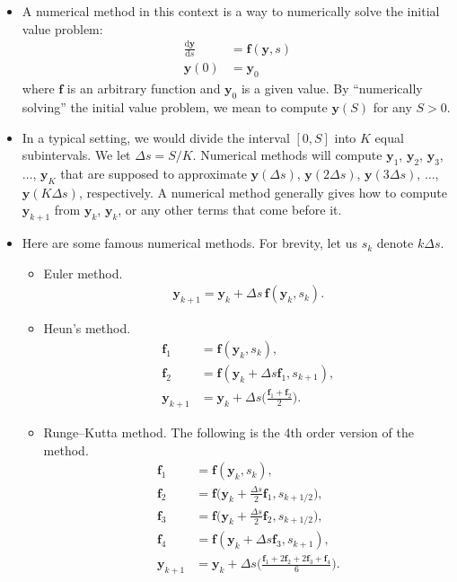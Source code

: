 \documentclass[10pt]{article}
\newcommand{\dee}{\mathrm{d}}
\newcommand{\ve}[1]{\mathbf{#1}}
\begin{document}
\begin{itemize}
  \item A numerical method in this context is a way to numerically solve the initial value problem:
  \begin{align*}
    \frac{\dee \ve{y}}{\dee s} &= \ve{f}(\ve{y}, s) \\
    \ve{y}(0) &= \ve{y}_0
  \end{align*}  
  where $\ve{f}$ is an arbitrary function and $\ve{y}_0$ is a given value. By ``numerically solving'' the initial value problem, we mean to compute $\ve{y}(S)$ for any $S > 0$.

  \item In a typical setting, we would divide the interval $[0,S]$ into $K$ equal subintervals. We let $\Delta s = S/K$. Numerical methods will compute $\ve{y}_{1}$, $\ve{y}_{2}$, $\ve{y}_{3}$, $\dotsc$, $\ve{y}_{K}$ that are supposed to approximate $\ve{y}(\Delta s)$, $\ve{y}(2\Delta s)$, $\ve{y}(3\Delta s)$, $\dotsc$, $\ve{y}(K \Delta s)$, respectively. A numerical method generally gives how to compute $\ve{y}_{k+1}$ from $\ve{y}_{k}$, $\ve{y}_{k}$, or any other terms that come before it.
  
  \item Here are some famous numerical methods. For brevity, let us $s_k$ denote $k \Delta s$.
  \begin{itemize}
    \item Euler method.
    \begin{align*}
      \ve{y}_{k+1} = \ve{y}_k + \Delta s\, \ve{f}(\ve{y}_k, s_k).
    \end{align*}

    \item Heun's method.
    \begin{align*}
      \ve{f}_1 &= \ve{f}(\ve{y}_k, s_k), \\
      \ve{f}_2 &= \ve{f}(\ve{y}_k + \Delta s\ve{f}_1, s_{k+1}), \\
      \ve{y}_{k+1} &= \ve{y}_k + \Delta s \bigg( \frac{\ve{f}_1 + \ve{f}_2}{2} \bigg).
    \end{align*}    

    \item Runge--Kutta method. The following is the 4th order version of the method.
    \begin{align*}
      \ve{f}_1 &= \ve{f}(\ve{y}_k, s_k), \\
      \ve{f}_2 &= \ve{f}\bigg(\ve{y}_k + \frac{\Delta s}{2}\ve{f}_1, s_{k+1/2} \bigg), \\
      \ve{f}_3 &= \ve{f}\bigg(\ve{y}_k + \frac{\Delta s}{2}\ve{f}_2, s_{k+1/2} \bigg), \\
      \ve{f}_4 &= \ve{f}(\ve{y}_k + \Delta s \ve{f}_3, s_{k+1}), \\
      \ve{y}_{k+1} &= \ve{y}_k + \Delta s \bigg( \frac{\ve{f}_1 + 2\ve{f}_2 + 2\ve{f}_3 + \ve{f}_4}{6} \bigg).
    \end{align*}


\end{itemize}
\end{itemize}
\end{document}
